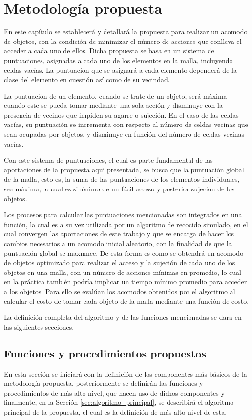 \chapter{Metodología propuesta}
\label{chap:propuesta}
%
%
En este capítulo se establecerá y detallará la propuesta para realizar un acomodo de objetos, con la condición de minimizar el número de acciones que conlleva el acceder a cada uno de ellos.
Dicha propuesta se basa en un sistema de puntuaciones, asignadas a cada uno de los elementos en la malla, incluyendo celdas vacías.
La puntuación que se asignará a cada elemento dependerá de la clase del elemento en cuestión así como de su vecindad.

La puntuación de un elemento, cuando se trate de un objeto, será máxima cuando este se pueda tomar mediante una sola acción y disminuye con la presencia de vecinos que impiden su agarre o sujeción.
En el caso de las celdas vacías, su puntuación se incrementa con respecto al número de celdas vecinas que sean ocupadas por objetos, y disminuye en función del número de celdas vecinas vacías.

Con este sistema de puntuaciones, el cual es parte fundamental de las aportaciones de la propuesta aquí presentada, se busca que la puntuación global de la malla, esto es, la suma de las puntuaciones de los elementos individuales, sea máxima; lo cual es sinónimo de un fácil acceso y posterior sujeción de los objetos.

Los procesos para calcular las puntuaciones mencionadas son integrados en una función, la cual es a su vez utilizada por un algoritmo de recocido simulado, en el cual convergen las aportaciones de este trabajo y que se encarga de hacer los cambios necesarios a un acomodo inicial aleatorio, con la finalidad de que la puntuación global se maximice.
De esta forma es como se obtendrá un acomodo de objetos optimizado para realizar el acceso y la sujeción de cada uno de los objetos en una malla, con un número de acciones mínimas en promedio, lo cual en la práctica también podría implicar un tiempo mínimo promedio para acceder a los objetos.
Para ello se evalúan los acomodos obtenidos por el algoritmo al calcular el costo de tomar cada objeto de la malla mediante una función de costo.

La definición completa del algoritmo y de las funciones mencionadas se dará en las siguientes secciones.
%
%
\section{Funciones y procedimientos propuestos}
\label{sec:funciones_y_procedimientos}
%
%
En esta sección se iniciará con la definición de los componentes más básicos de la metodología propuesta, posteriormente se definirán las funciones y procedimientos de más alto nivel, que hacen uso de dichos componentes y finalmente, en la Sección \ref{sec:algoritmo_principal}, se describirá el algoritmo principal de la propuesta, el cual es la definición de más alto nivel de esta.

